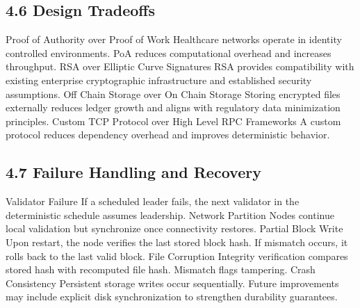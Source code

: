 \subsection*{4.6 Design Tradeoffs}
Proof of Authority over Proof of Work
Healthcare networks operate in identity controlled environments. PoA reduces computational overhead and increases throughput.
RSA over Elliptic Curve Signatures
RSA provides compatibility with existing enterprise cryptographic infrastructure and established security assumptions.
Off Chain Storage over On Chain Storage
Storing encrypted files externally reduces ledger growth and aligns with regulatory data minimization principles.
Custom TCP Protocol over High Level RPC Frameworks
A custom protocol reduces dependency overhead and improves deterministic behavior.

\subsection*{4.7 Failure Handling and Recovery}
Validator Failure
If a scheduled leader fails, the next validator in the deterministic schedule assumes leadership.
Network Partition
Nodes continue local validation but synchronize once connectivity restores.
Partial Block Write
Upon restart, the node verifies the last stored block hash. If mismatch occurs, it rolls back to the last valid block.
File Corruption
Integrity verification compares stored hash with recomputed file hash. Mismatch flags tampering.
Crash Consistency
Persistent storage writes occur sequentially. Future improvements may include explicit disk synchronization to strengthen durability guarantees.

